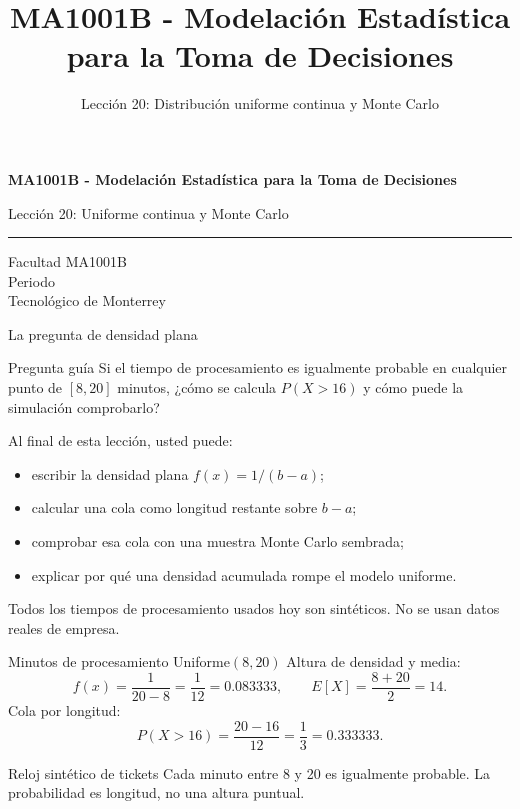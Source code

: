 \documentclass[aspectratio=169,10pt,spanish]{beamer}
\title{MA1001B - Modelación Estadística para la Toma de Decisiones}
\subtitle{Lección 20: Distribución uniforme continua y Monte Carlo}
\author{}
\institute{Tecnol\'ogico de Monterrey}
\date{}
\begin{document}
\begin{frame}[plain]
  \vspace{1.2cm}
  {\Large\bfseries MA1001B - Modelación Estadística para la Toma de Decisiones\par}
  \vspace{0.7cm}
  {\large Lección 20: Uniforme continua y Monte Carlo\par}
  \vspace{0.7cm}
  {\color{TecRojo}\rule{\textwidth}{1.2pt}}
  \vspace{0.8cm}

  Facultad MA1001B\\[0.3cm]
  Periodo\\[0.3cm]
  Tecnol\'ogico de Monterrey
\end{frame}

\begin{frame}{La pregunta de densidad plana}
  \begin{alertblock}{Pregunta guía}
    Si el tiempo de procesamiento es igualmente probable en cualquier punto de
    $[8,20]$ minutos, ¿cómo se calcula $P(X>16)$ y cómo puede la simulación
    comprobarlo?
  \end{alertblock}

  \vspace{0.6em}
  Al final de esta lección, usted puede:
  \begin{itemize}
    \item escribir la densidad plana $f(x)=1/(b-a)$;
    \item calcular una cola como longitud restante sobre $b-a$;
    \item comprobar esa cola con una muestra Monte Carlo sembrada;
    \item explicar por qué una densidad acumulada rompe el modelo uniforme.
  \end{itemize}

  \vfill
  \scriptsize Todos los tiempos de procesamiento usados hoy son sintéticos. No se usan datos reales de empresa.
\end{frame}

\begin{frame}{Minutos de procesamiento Uniforme$(8,20)$}
  \small
  Altura de densidad y media:
  \[
    f(x)=\frac{1}{20-8}=\frac{1}{12}=0.083333,
    \qquad
    E[X]=\frac{8+20}{2}=14.
  \]
  Cola por longitud:
  \[
    P(X>16)=\frac{20-16}{12}=\frac{1}{3}=0.333333.
  \]

  \vspace{0.3em}
  \begin{exampleblock}{Reloj sintético de tickets}
    Cada minuto entre 8 y 20 es igualmente probable. La probabilidad es
    longitud, no una altura puntual.
  \end{exampleblock}
\end{frame}
\end{document}
